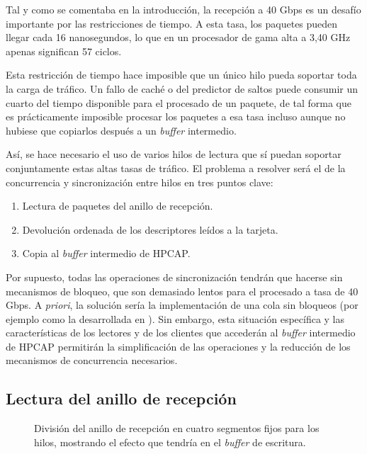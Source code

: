\documentclass[twoside, 12pt]{epstfg}
\begin{document}
Tal y como se comentaba en la introducción, la recepción a 40 Gbps es un desafío importante por las restricciones de tiempo. A esta tasa, los paquetes pueden llegar cada 16 nanosegundos, lo que en un procesador de gama alta a 3,40 GHz apenas significan 57 ciclos.

Esta restricción de tiempo hace imposible que un único hilo pueda soportar toda la carga de tráfico. Un fallo de caché o del predictor de saltos puede consumir un cuarto del tiempo disponible para el procesado de un paquete, de tal forma que es prácticamente imposible procesar los paquetes a esa tasa incluso aunque no hubiese que copiarlos después a un \textit{buffer} intermedio.

Así, se hace necesario el uso de varios hilos de lectura que sí puedan soportar conjuntamente estas altas tasas de tráfico. El problema a resolver será el de la concurrencia y sincronización entre hilos en tres puntos clave:

\begin{enumerate}[itemsep=0pt, topsep = 0pt]
\item Lectura de paquetes del anillo de recepción.
\item Devolución ordenada de los descriptores leídos a la tarjeta.
\item Copia al \textit{buffer} intermedio de HPCAP.
\end{enumerate}

Por supuesto, todas las operaciones de sincronización tendrán que hacerse sin mecanismos de bloqueo, que son demasiado lentos para el procesado a tasa de 40 Gbps. A \textit{priori}, la solución sería la implementación de una cola sin bloqueos (por ejemplo como la desarrollada en \cite{krizhanovsky2013lock}). Sin embargo, esta situación específica y las características de los lectores y de los clientes que accederán al \textit{buffer} intermedio de HPCAP permitirán la simplificación de las operaciones y la reducción de los mecanismos de concurrencia necesarios.

\subsection{Lectura del anillo de recepción}

\begin{figure}[hbtp]
\centering

\caption[División del anillo de recepción en cuatro segmentos fijos para los hilos]{División del anillo de recepción en cuatro segmentos fijos para los hilos, mostrando el efecto que tendría en el \textit{buffer} de escritura.}
\label{fig:Desarrollo:RingAssignment}
\end{figure}
\end{document}
